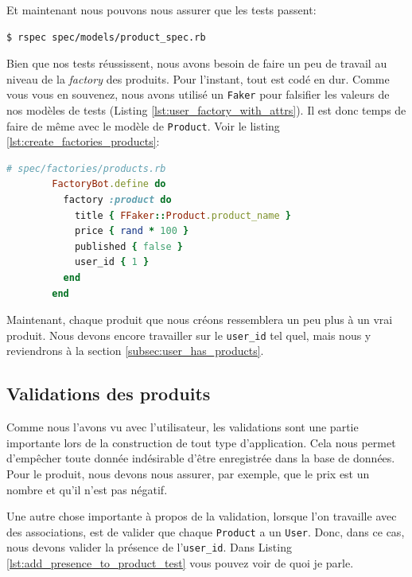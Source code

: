 \documentclass[]{report}
\begin{document}
      Et maintenant nous pouvons nous assurer que les tests passent:

      \begin{scriptsize}
        \begin{lstlisting}[language=bash]
        $ rspec spec/models/product_spec.rb
        \end{lstlisting}
      \end{scriptsize}

      Bien que nos tests réussissent, nous avons besoin de faire un peu de travail au niveau de la \textit{factory} des produits. Pour l'instant, tout est codé en dur. Comme vous vous en souvenez, nous avons utilisé un \verb|Faker| pour falsifier les valeurs de nos modèles de tests (Listing \ref{lst:user_factory_with_attrs}). Il est donc temps de faire de même avec le modèle de \verb|Product|. Voir le listing \ref{lst:create_factories_products}:

      \begin{scriptsize}
        \begin{lstlisting}[language=ruby, caption={Création de la factory pour le modèle produit}, label={lst:create_factories_products}]
        # spec/factories/products.rb
        FactoryBot.define do
          factory :product do
            title { FFaker::Product.product_name }
            price { rand * 100 }
            published { false }
            user_id { 1 }
          end
        end
        \end{lstlisting}
      \end{scriptsize}

      Maintenant, chaque produit que nous créons ressemblera un peu plus à un vrai produit. Nous devons encore travailler sur le \verb|user_id| tel quel, mais nous y reviendrons à la section \ref{subsec:user_has_products}.

    \subsection{Validations des produits}

      Comme nous l'avons vu avec l'utilisateur, les validations sont une partie importante lors de la construction de tout type d'application. Cela nous permet d'empêcher toute donnée indésirable d'être enregistrée dans la base de données. Pour le produit, nous devons nous assurer, par exemple, que le prix est un nombre et qu'il n'est pas négatif.

      Une autre chose importante à propos de la validation, lorsque l'on travaille avec des associations, est de valider que chaque \verb|Product| a un \verb|User|. Donc, dans ce cas, nous devons valider la présence de l'\verb|user_id|. Dans Listing \ref{lst:add_presence_to_product_test} vous pouvez voir de quoi je parle.
\end{document}
